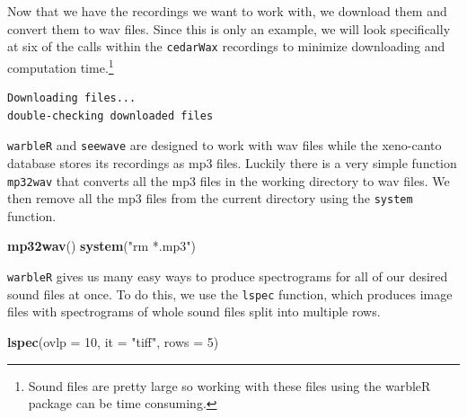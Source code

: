 \documentclass[
]{krantz}
\makeatletter
\newenvironment{Shaded}{\begin{snugshade}}{\end{snugshade}}
\newcommand{\DataTypeTok}[1]{\textcolor[rgb]{0.27,0.27,0.27}{#1}}
\newcommand{\DecValTok}[1]{\textcolor[rgb]{0.06,0.06,0.06}{#1}}
\newcommand{\KeywordTok}[1]{\textcolor[rgb]{0.27,0.27,0.27}{\textbf{#1}}}
\newcommand{\NormalTok}[1]{#1}
\newcommand{\OperatorTok}[1]{\textcolor[rgb]{0.43,0.43,0.43}{\textbf{#1}}}
\newcommand{\StringTok}[1]{\textcolor[rgb]{0.5,0.5,0.5}{#1}}
\newenvironment{kframe}{%
\medskip{}
\setlength{\fboxsep}{.8em}
 \def\at@end@of@kframe{}%
 \ifinner\ifhmode%
  \def\at@end@of@kframe{\end{minipage}}%
  \begin{minipage}{\columnwidth}%
 \fi\fi%
 \def\FrameCommand##1{\hskip\@totalleftmargin \hskip-\fboxsep
 \colorbox{shadecolor}{##1}\hskip-\fboxsep
     \hskip-\linewidth \hskip-\@totalleftmargin \hskip\columnwidth}%
 \MakeFramed {\advance\hsize-\width
   \@totalleftmargin\z@ \linewidth\hsize
   \@setminipage}}%
 {\par\unskip\endMakeFramed%
 \at@end@of@kframe}
\renewenvironment{Shaded}{\begin{kframe}}{\end{kframe}}
\makeatother
\begin{document}
Now that we have the recordings we want to work with, we download them and convert them to wav files. Since this is only an example, we will look specifically at six of the calls within the \texttt{cedarWax} recordings to minimize downloading and computation time.\footnote{Sound files are pretty large so working with these files using the warbleR package can be time consuming.}

\begin{Shaded}
\end{Shaded}

\begin{verbatim}
Downloading files...
double-checking downloaded files
\end{verbatim}

\texttt{warbleR} and \texttt{seewave} are designed to work with wav files while the xeno-canto database stores its recordings as mp3 files. Luckily there is a very simple function \texttt{mp32wav} that converts all the mp3 files in the working directory to wav files. We then remove all the mp3 files from the current directory using the \texttt{system} function.

\begin{Shaded}
\begin{Highlighting}[]
\KeywordTok{mp32wav}\NormalTok{()}
\KeywordTok{system}\NormalTok{(}\StringTok{"rm *.mp3"}\NormalTok{)}
\end{Highlighting}
\end{Shaded}

\texttt{warbleR} gives us many easy ways to produce spectrograms for all of our desired sound files at once. To do this, we use the \texttt{lspec} function, which produces image files with spectrograms of whole sound files split into multiple rows.

\begin{Shaded}
\begin{Highlighting}[]
\KeywordTok{lspec}\NormalTok{(}\DataTypeTok{ovlp =} \DecValTok{10}\NormalTok{, }\DataTypeTok{it =} \StringTok{"tiff"}\NormalTok{, }\DataTypeTok{rows =} \DecValTok{5}\NormalTok{)}
\end{Highlighting}
\end{Shaded}
\end{document}
